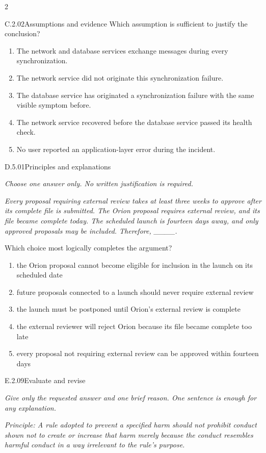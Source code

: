 \documentclass[9pt]{extarticle}
\newcommand{\choice}[1]{\item #1}
\begin{document}
\begin{multicols}{2}
\begin{DenseCoreProblem}{C.2.02}{Assumptions and evidence}
Which assumption is sufficient to justify the conclusion?
\begin{enumerate}[label=(\alph*)]
  \choice{The network and database services exchange messages during every synchronization.}
  \choice{The network service did not originate this synchronization failure.}
  \choice{The database service has originated a synchronization failure with the same visible symptom before.}
  \choice{The network service recovered before the database service passed its health check.}
  \choice{No user reported an application-layer error during the incident.}
\end{enumerate}
\end{DenseCoreProblem}
\begin{DenseCoreProblem}{D.5.01}{Principles and explanations}
{\scriptsize\textit{Choose one answer only. No written justification is required.}\par}
\emph{Every proposal requiring external review takes at least three weeks to approve after its complete file is submitted. The Orion proposal requires external review, and its file became complete today. The scheduled launch is fourteen days away, and only approved proposals may be included. Therefore, \_\_\_\_.}

Which choice most logically completes the argument?
\begin{enumerate}[label=(\alph*)]
  \choice{the Orion proposal cannot become eligible for inclusion in the launch on its scheduled date}
  \choice{future proposals connected to a launch should never require external review}
  \choice{the launch must be postponed until Orion's external review is complete}
  \choice{the external reviewer will reject Orion because its file became complete too late}
  \choice{every proposal not requiring external review can be approved within fourteen days}
\end{enumerate}
\end{DenseCoreProblem}
\begin{DenseCoreProblem}{E.2.09}{Evaluate and revise}
{\scriptsize\textit{Give only the requested answer and one brief reason. One sentence is enough for any explanation.}\par}
\emph{Principle: A rule adopted to prevent a specified harm should not prohibit conduct shown not to create or increase that harm merely because the conduct resembles harmful conduct in a way irrelevant to the rule's purpose.}


\end{DenseCoreProblem}
\end{multicols}
\end{document}
